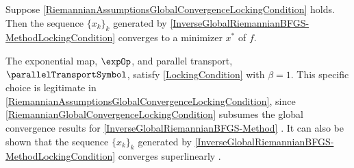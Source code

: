 \begin{theorem} \label{RiemannianGlobalConvergenceLockingCondition}
    Suppose \cref{RiemannianAssumptionsGlobalConvergenceLockingCondition} holds. Then the sequence $\{x_k\}_k$ generated by \cref{InverseGlobalRiemannianBFGS-MethodLockingCondition} converges to a minimizer $x^*$ of $f$.
\end{theorem}

The exponential map, $\expOp$, and parallel transport, $\parallelTransportSymbol$, satisfy \cref{LockingCondition} with $\beta = 1$. This specific choice is legitimate in \cref{RiemannianAssumptionsGlobalConvergenceLockingCondition}, since \cref{RiemannianGlobalConvergenceLockingCondition} subsumes the global convergence results for \cref{InverseGlobalRiemannianBFGS-Method} \cite[p.~1663-1664]{HuangGallivanAbsil:2015}. It can also be shown that the sequence $\{x_k\}_k$ generated by \cref{InverseGlobalRiemannianBFGS-MethodLockingCondition} converges superlinearly \cite[p.~1684]{HuangGallivanAbsil:2015}. 



